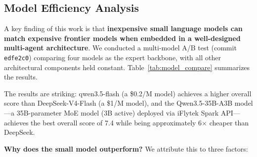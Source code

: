 \subsection{Model Efficiency Analysis}

A key finding of this work is that \textbf{inexpensive small language models can match expensive frontier models when embedded in a well-designed multi-agent architecture}. We conducted a multi-model A/B test (commit \texttt{edfe2c0}) comparing four models as the expert backbone, with all other architectural components held constant. Table~\ref{tab:model_compare} summarizes the results.

\begin{table}[!t]
\centering
\caption{Model comparison. Pass rate and overall score from multi-model A/B test (commit \texttt{edfe2c0}); Qwen3.5-35B-A3B row from 2026-06-02 test. Pricing as of 2025-05.}
\label{tab:model_compare}
\end{table}

The results are striking: qwen3.5-flash (a \$0.2/M model) achieves a higher overall score than DeepSeek-V4-Flash (a \$1/M model), and the Qwen3.5-35B-A3B model---a 35B-parameter MoE model (3B active) deployed via iFlytek Spark API---achieves the best overall score of 7.4 while being approximately 6$\times$ cheaper than DeepSeek.

\textbf{Why does the small model outperform?} We attribute this to three factors:

